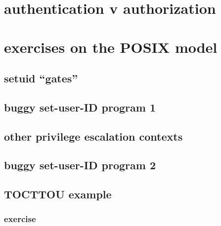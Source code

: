 \section{authentication v authorization}


\section{exercises on the POSIX model}


\subsection{setuid ``gates''}


\subsection{buggy set-user-ID program 1}


\subsection{other privilege escalation contexts}


\subsection{buggy set-user-ID program 2}


\subsection{TOCTTOU example}




\subsubsection{exercise}

